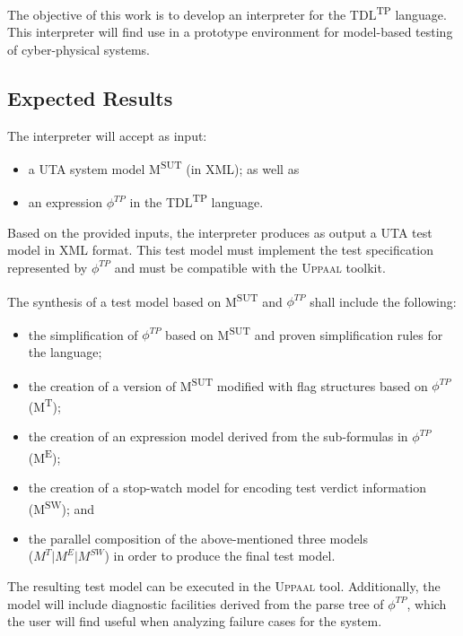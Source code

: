 \documentclass[12pt,oneside,a4paper,notitlepage]{article}
\begin{document}
	\bigskip

	\par The objective of this work is to develop an interpreter for the TDL\textsuperscript{TP} language. This interpreter will find use in a prototype environment for model-based testing of cyber-physical systems.

	\subsection*{Expected Results}
	\par The interpreter will accept as input:
	\begin{itemize}
		\item a UTA system model M\textsuperscript{SUT} (in XML); as well as
		\item an expression $\phi^{TP}$ in the TDL\textsuperscript{TP} language.
	\end{itemize}

	\par Based on the provided inputs, the interpreter produces as output a UTA test model in XML format. This test model must implement the test specification represented by $\phi^{TP}$ and must be compatible with the \textsc{Uppaal} toolkit.

	\bigskip

	\par The synthesis of a test model based on M\textsuperscript{SUT} and $\phi^{TP}$ shall include the following:
	\begin{itemize}
		\item the simplification of $\phi^{TP}$ based on M\textsuperscript{SUT} and proven simplification rules for the language;
		\item the creation of a version of M\textsuperscript{SUT} modified with flag structures based on $\phi^{TP}$  (M\textsuperscript{T});
		\item the creation of an expression model derived from the sub-formulas in $\phi^{TP}$ (M\textsuperscript{E});
		\item the creation of a stop-watch model for encoding test verdict information (M\textsuperscript{SW}); and
		\item the parallel composition of the above-mentioned three models \\
		($M^{T} \vert M^{E} \vert M^{SW}$) in order to produce the final test model.
	\end{itemize}

	\par The resulting test model can be executed in the \textsc{Uppaal} tool. Additionally, the model will include diagnostic facilities derived from the parse tree of $\phi^{TP}$, which the user will find useful when analyzing failure cases for the system.
\end{document}
